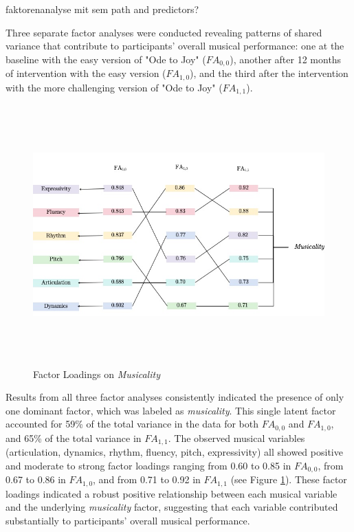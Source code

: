 faktorenanalyse mit sem path and predictors?


Three separate factor analyses were conducted revealing patterns of shared variance that contribute to participants' overall musical performance: one at the baseline with the easy version of "Ode to Joy" ($FA_{0,0}$), another after 12 months of intervention with the easy version ($FA_{1,0}$), and the third after the intervention with the more challenging version of "Ode to Joy" ($FA_{1,1}$).
\begin{figure}[h]
	\centering
	\includegraphics[width=15cm,height=10cm,keepaspectratio]{Loadings}
	\caption{Factor Loadings on \textit{Musicality}}
	\label{fig:loadings}
\end{figure}

Results from all three factor analyses consistently indicated the presence of only one dominant factor, which was labeled as \textit{musicality}. This single latent factor accounted for 59\% of the total variance in the data for both $FA_{0,0}$ and $FA_{1,0}$, and 65\% of the total variance in $FA_{1,1}$. The observed musical variables (articulation, dynamics, rhythm, fluency, pitch, expressivity) all showed positive and moderate to strong factor loadings ranging from 0.60 to 0.85 in $FA_{0,0}$, from 0.67 to 0.86 in $FA_{1,0}$, and from 0.71 to 0.92 in $FA_{1,1}$ (see Figure \ref{fig:loadings}). These factor loadings indicated a robust positive relationship between each musical variable and the underlying \textit{musicality} factor, suggesting that each variable contributed substantially to participants' overall musical performance. 

